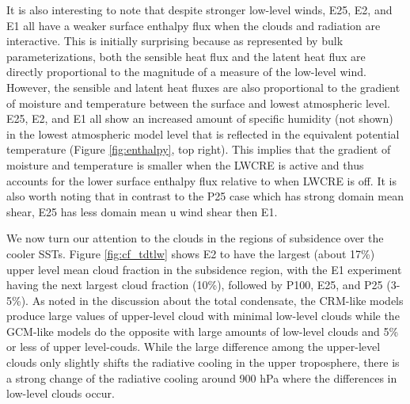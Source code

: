 \documentclass[draft]{agujournal2019}
\begin{document}
It is also interesting to note that despite stronger low-level winds, E25, E2, and E1 all have a weaker surface
enthalpy flux when the clouds and radiation are interactive.  This is initially surprising because as represented 
by bulk parameterizations, both the sensible heat flux and the latent heat flux are directly proportional to the 
magnitude of a measure of the low-level wind.  However, the sensible and latent heat fluxes are also 
proportional to the gradient of moisture and temperature between the surface and lowest atmospheric 
level.    
E25, E2, and E1 all show an increased amount of specific humidity (not shown) in the lowest atmospheric 
model level that is reflected in the equivalent potential temperature (Figure \ref{fig:enthalpy}, top right).  This 
implies that the gradient of moisture and temperature is smaller when the LWCRE is active and thus accounts 
for the lower surface enthalpy flux relative to when LWCRE is off.         
It is also worth noting that in contrast to the P25 case which has strong domain mean shear, E25 has less domain 
mean u wind shear then E1.  


We now turn our attention to the clouds in the regions of subsidence over the cooler SSTs.
Figure \ref{fig:cf_tdtlw} shows E2 to have the largest (about 17\%) upper level mean cloud
fraction in the subsidence region, with the E1 experiment having the next largest cloud fraction (10\%), followed by 
P100, E25, and P25 (3-5\%).  As noted in the discussion about the total condensate, the CRM-like models 
produce large values of upper-level cloud with minimal low-level clouds while the GCM-like models
do the opposite with large amounts of low-level clouds and 5\% or less of upper level-couds.   
While the large difference among the upper-level clouds only slightly shifts the radiative cooling in the
upper troposphere, there is a strong change of the radiative cooling around 900 hPa where the 
differences in low-level clouds occur.  
\end{document}
